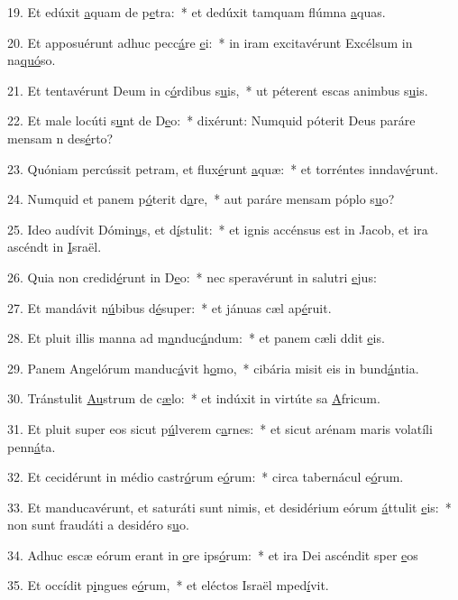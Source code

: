 19. Et edúxit \uline{a}quam de p\uline{e}tra:~* et dedúxit tamquam flúmna \uline{a}quas.\par 
20. Et apposuérunt adhuc pecc\uline{á}re \uline{e}i:~* in iram excitavérunt Excélsum in na\uline{quó}so.\par 
21. Et tentavérunt Deum in c\uline{ó}rdibus s\uline{u}is,~* ut péterent escas animbus s\uline{u}is.\par 
22. Et male locúti s\uline{u}nt de D\uline{e}o:~* dixérunt: Numquid póterit Deus paráre mensam n des\uline{é}rto?\par 
23. Quóniam percússit petram, et flux\uline{é}runt \uline{a}quæ:~* et torréntes inndav\uline{é}runt.\par 
24. Numquid et panem p\uline{ó}terit d\uline{a}re,~* aut paráre mensam póplo s\uline{u}o?\par 
25. Ideo audívit Dómin\uline{u}s, et d\uline{í}stulit:~* et ignis accénsus est in Jacob, et ira ascéndt in \uline{I}sraël.\par 
26. Quia non credid\uline{é}runt in D\uline{e}o:~* nec speravérunt in salutri \uline{e}jus:\par 
27. Et mandávit n\uline{ú}bibus d\uline{é}super:~* et jánuas cæl ap\uline{é}ruit.\par 
28. Et pluit illis manna ad m\uline{a}nduc\uline{á}ndum:~* et panem cæli ddit \uline{e}is.\par 
29. Panem Angelórum manduc\uline{á}vit h\uline{o}mo,~* cibária misit eis in bund\uline{á}ntia.\par 
30. Tránstulit \uline{Au}strum de c\uline{æ}lo:~* et indúxit in virtúte sa \uline{A}fricum.\par 
31. Et pluit super eos sicut p\uline{ú}lverem c\uline{a}rnes:~* et sicut arénam maris volatíli penn\uline{á}ta.\par 
32. Et cecidérunt in médio castr\uline{ó}rum e\uline{ó}rum:~* circa tabernácul e\uline{ó}rum.\par 
33. Et manducavérunt, et saturáti sunt nimis, et desidérium eórum \uline{á}ttulit \uline{e}is:~* non sunt fraudáti a desidéro s\uline{u}o.\par 
34. Adhuc escæ eórum erant in \uline{o}re ips\uline{ó}rum:~* et ira Dei ascéndit sper \uline{e}os\par 
35. Et occídit p\uline{i}ngues e\uline{ó}rum,~* et eléctos Israël mped\uline{í}vit.\par 

